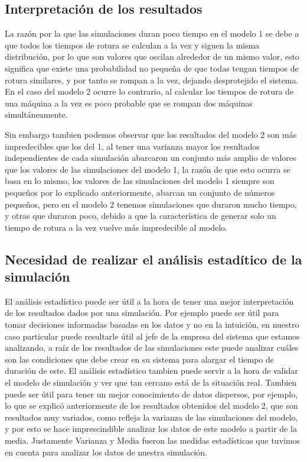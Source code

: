 \documentclass[11pt]{article}
\begin{document}
    \subsection{Interpretación de los resultados}
    La razón por la que las simulaciones duran poco tiempo en el modelo 1 se debe a que todos los tiempos de rotura se calculan a la 
    vez y siguen la misma distribución, por lo que son valores que oscilan alrededor de un mismo valor, esto significa que existe una 
    probabilidad no pequeña de que todas tengan tiempos de rotura similares, y por tanto se rompan a la vez, dejando desprotejido el 
    sistema. En el caso del modelo 2 ocurre lo contrario, al calcular los tiempos de rotura de una máquina a la vez es poco probable que 
    se rompan dos máquinas simultáneamente.

    Sin embargo tambien podemos observar que los resultados del modelo 2 son más impredecibles que los del 1, al tener una varianza mayor 
    los resultados independientes de cada simulación abarcaron un conjunto más amplio de valores que los valores de las simulaciones del 
    modelo 1, la razón de que esto ocurra se basa en lo mismo, los valores de las simulaciones del modelo 1 siempre son pequeños por lo 
    explicado anteriormente, abarcan un conjunto de números pequeños, pero en el modelo 2 tenemos simulaciones que duraron mucho tiempo, y 
    otras que duraron poco, debido a que la característica de generar solo un tiempo de rotura a la vez vuelve más impredecible al modelo.


    \subsection{Necesidad de realizar el análisis estadítico de la simulación}
    El análisis estadístico puede ser útil a la hora de tener una mejor interpretación de los resultados dados por una simulación. Por ejemplo
    puede ser útil para tomar decisiones informadas basadas en los datos y no en la intuición, en nuestro caso particular puede resultarle útil 
    al jefe de la empresa del sistema que estamos analizando, a raíz de los resultados de las simulaciones este puede analizar cuáles son las 
    condiciones que debe crear en su sistema para alargar el tiempo de duración de este. El análisis estadístico tambien puede servir a la hora 
    de validar el modelo de simulación y ver que tan cercano está de la situación real. Tambien puede ser útil para tener un mejor conocimiento 
    de datos dispersos, por ejemplo, lo que se explicó anteriormente de los resultados obtenidos del modelo 2, que son resultados muy variados, como refleja 
    la varianza de las simulaciones del modelo, y por esto se hace imprescindible analizar los datos de este modelo a partir de la media. Justamente 
    Varianza y Media fueron las medidas estadísticas que tuvimos en cuenta para analizar los datos de nuestra simulación.
\end{document}

